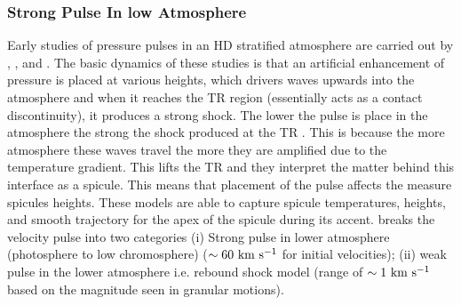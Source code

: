 \subsubsection{Strong Pulse In low Atmosphere}
\label{sssec:pulse_model}
 Early studies of pressure pulses in an HD stratified atmosphere are carried out by \cite{Suematsu1982SoPh7599S}, \cite{Shibata1982, Shibata1982SoPh78333S}, and \citep{Hollweg1982ApJ257345H}. The basic dynamics of these studies is that an artificial enhancement of pressure is placed at various heights, which drivers waves upwards into the atmosphere and when it reaches the TR region (essentially acts as a contact discontinuity), it produces a strong shock. The lower the pulse is place in the atmosphere the strong the shock produced at the TR \citep{Shibata1982, Shibata1982SoPh78333S}. This is because the more atmosphere these waves travel the more they are amplified due to the temperature gradient. This lifts the TR and they interpret the matter behind this interface as a spicule. This means that placement of the pulse affects the measure spicules heights. These models are able to capture spicule temperatures, heights, and smooth trajectory for the apex of the spicule during its accent. \np \np     
\cite{Sterling_2000SoPh} breaks the velocity pulse into two categories (i) Strong pulse in lower atmosphere (photosphere to low chromosphere) ($\sim 60~\rm{km ~s^{-1}}$ for initial velocities); (ii) weak pulse in the lower atmosphere i.e. rebound shock model (range of $\sim 1 ~\rm{km ~s^{-1}}$ based on the magnitude seen in granular motions). 


